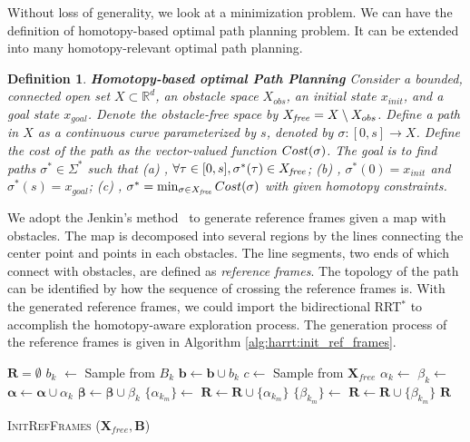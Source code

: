 \documentclass[letterpaper, 10 pt, conference]{ieeeconf}
\newtheorem{defn}{Definition}
\begin{document}
Without loss of generality, we look at a minimization problem.
We can have the definition of homotopy-based optimal path planning problem.
It can be extended into many homotopy-relevant optimal path planning.
\begin{defn}{ \textbf{Homotopy-based optimal Path Planning} }
Consider a bounded, connected open set $ X \subset \mathbb{R}^{d} $, an obstacle space $ X_{obs} $, an initial state $ x_{init} $, and a goal state $ x_{goal} $. 
Denote the obstacle-free space by $ X_{\it free} = X \setminus X_{obs} $.
Define a {\em path} in $X$ as a continuous curve parameterized by $s$, denoted by $\sigma : [0,s] \rightarrow X$. 
Define the cost of the path as the vector-valued function $ {\sc Cost} (\sigma) $.  
The goal is to find paths $ \sigma^{*} \in \Sigma^{*}$ such that
\textit{ (a) }, $\forall \tau\in[0,s], \sigma^*(\tau) \in X_{\it free}$;
\textit{ (b) }, $ \sigma^{*} (0) = x_{init} $ and $ \sigma^{*} (s) = x_{goal}  $;
\textit{ (c) }, $ \sigma^{*} = \min_{\sigma \in X_{\it free} } {\sc Cost} (\sigma) $ with given homotopy constraints.
\end{defn} 

We adopt the Jenkin's method~\cite{Hernandez201544} to generate reference frames given a map with obstacles.
The map is decomposed into several regions by the lines connecting the center point and points in each obstacles.
The line segments, two ends of which connect with obstacles, are defined as \emph{reference frames}.
The topology of the path can be identified by how the sequence of crossing the reference frames is.
With the generated reference frames, we could import the bidirectional RRT$^{*}$ to accomplish the homotopy-aware exploration process.
The generation process of the reference frames is given in Algorithm \ref{alg:harrt:init_ref_frames}.

\begin{algorithm}[hbtp]
	\begin{algorithmic}[1]
		\State $ \bm{R} = \emptyset $
			\State $ b_{k} $ $ \leftarrow $ Sample from $ B_{k} $
			\State $ \bm{b} \leftarrow \bm{b} \cup b_{k} $
		\EndFor
			\State $ c \leftarrow  $ Sample from $ \bm{X}_{free} $
		\EndWhile
			\State $ \alpha_{k} \leftarrow $ 
			\State $ \beta_{k} \leftarrow $ 
			\State $ \bm{\alpha} \leftarrow \bm{\alpha} \cup \alpha_{k} $
			\State $ \bm{\beta} \leftarrow \bm{\beta} \cup \beta_{k} $			
		\EndFor
			\State $ \{ \alpha_{k_{m}} \} \leftarrow $ 
			\State $ \bm{R} \leftarrow \bm{R} \cup \{ \alpha_{k_{m}} \} $
		\EndFor
			\State $ \{ \beta_{k_{m}} \} \leftarrow $ 
			\State $ \bm{R} \leftarrow \bm{R} \cup \{ \beta_{k_{m}} \} $
		\EndFor
		\Return $ \bm{R} $
	\end{algorithmic}
	\caption{ \textsc{InitRefFrames} ($ \bm{X}_{free} , \bm{B} $) }
	\label{alg:harrt:init_ref_frames}
\end{algorithm} 
\end{document}
